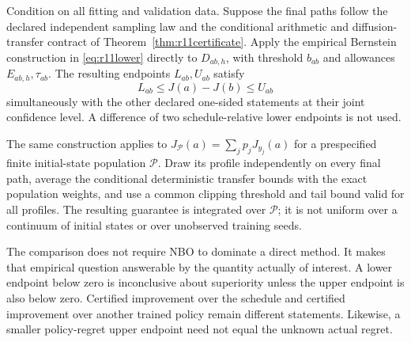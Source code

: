 \begin{theorem}\label{thm:r12paired}
Condition on all fitting and validation data. Suppose the final paths follow the declared independent sampling law and the conditional arithmetic and diffusion-transfer contract of Theorem~\ref{thm:r11certificate}. Apply the empirical Bernstein construction in \eqref{eq:r11lower} directly to $D_{ab,h}$, with threshold $b_{ab}$ and allowances $E_{ab,h},\tau_{ab}$. The resulting endpoints $L_{ab},U_{ab}$ satisfy
\[
 L_{ab}\leq J(a)-J(b)\leq U_{ab}
\]
simultaneously with the other declared one-sided statements at their joint confidence level. A difference of two schedule-relative lower endpoints is not used.

The same construction applies to $J_{\mathcal P}(a)=\sum_j p_jJ_{y_j}(a)$ for a prespecified finite initial-state population $\mathcal P$. Draw its profile independently on every final path, average the conditional deterministic transfer bounds with the exact population weights, and use a common clipping threshold and tail bound valid for all profiles. The resulting guarantee is integrated over $\mathcal P$; it is not uniform over a continuum of initial states or over unobserved training seeds.
\end{theorem}

The comparison does not require NBO to dominate a direct method. It makes that empirical question answerable by the quantity actually of interest. A lower endpoint below zero is inconclusive about superiority unless the upper endpoint is also below zero. Certified improvement over the schedule and certified improvement over another trained policy remain different statements. Likewise, a smaller policy-regret upper endpoint need not equal the unknown actual regret.
